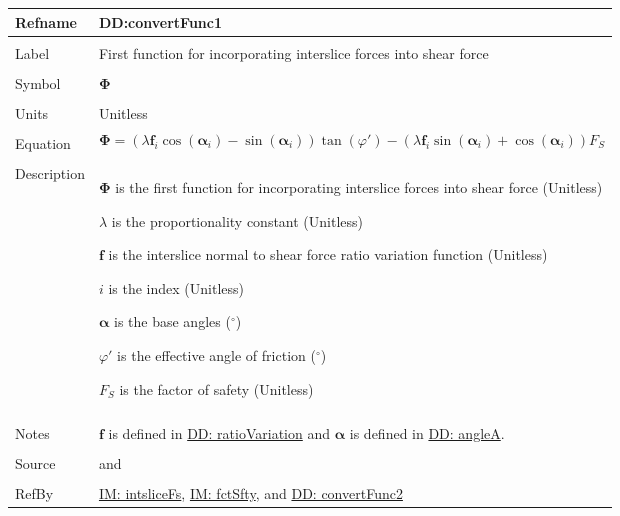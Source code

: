 \documentclass[12pt]{article}
\begin{document}
\noindent \begin{minipage}{\textwidth}
          \begin{tabular}{>{\raggedright}p{}>{\raggedright\arraybackslash}p{}}
          \toprule \textbf{Refname} & \textbf{DD:convertFunc1}
          \label{DD:convertFunc1}
          \\ \midrule \\
          Label & First function for incorporating interslice forces into shear force
          \\ \midrule \\
          Symbol & $\mathbf{Φ}$
          \\ \midrule \\
          Units & Unitless
          \\ \midrule \\
          Equation & \begin{displaymath}
                     \mathbf{Φ}=\left(λ {\mathbf{f}}_{i} \cos\left({\mathbf{α}}_{i}\right)-\sin\left({\mathbf{α}}_{i}\right)\right) \tan\left(φ'\right)-\left(λ {\mathbf{f}}_{i} \sin\left({\mathbf{α}}_{i}\right)+\cos\left({\mathbf{α}}_{i}\right)\right) {F_{S}}
                     \end{displaymath}
          \\ \midrule \\
          Description & \begin{symbDescription}
                        \item{$\mathbf{Φ}$ is the first function for incorporating interslice forces into shear force (Unitless)}
                        \item{$λ$ is the proportionality constant (Unitless)}
                        \item{$\mathbf{f}$ is the interslice normal to shear force ratio variation function (Unitless)}
                        \item{$i$ is the index (Unitless)}
                        \item{$\mathbf{α}$ is the base angles (${}^{\circ}$)}
                        \item{$φ'$ is the effective angle of friction (${}^{\circ}$)}
                        \item{${F_{S}}$ is the factor of safety (Unitless)}
                        \end{symbDescription}
          \\ \midrule \\
          Notes & $\mathbf{f}$ is defined in \hyperref[DD:ratioVariation]{DD: ratioVariation} and $\mathbf{α}$ is defined in \hyperref[DD:angleA]{DD: angleA}.
          \\ \midrule \\
          Source & \cite{chen2005} and \cite{karchewski2012}
          \\ \midrule \\
          RefBy & \hyperref[IM:intsliceFs]{IM: intsliceFs}, \hyperref[IM:fctSfty]{IM: fctSfty}, and \hyperref[DD:convertFunc2]{DD: convertFunc2}
          \\ \bottomrule
          \end{tabular}
          \end{minipage}
\end{document}
